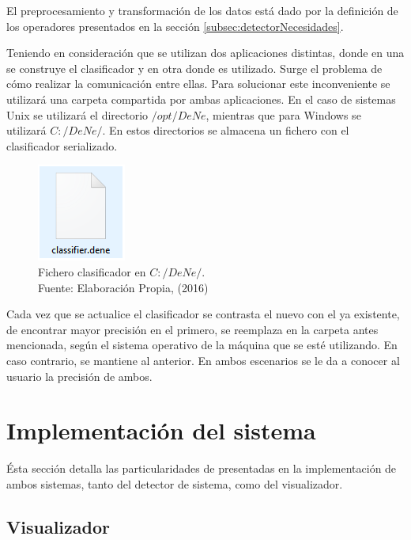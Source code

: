 El preprocesamiento y transformación de los datos está dado por la definición de los operadores presentados en la sección \ref{subsec:detectorNecesidades}.

Teniendo en consideración que se utilizan dos aplicaciones distintas, donde en una se construye el clasificador y en otra donde es utilizado. Surge el problema de cómo realizar la comunicación entre ellas. Para solucionar este inconveniente se utilizará una carpeta compartida por ambas aplicaciones. En el caso de sistemas Unix se utilizará el directorio $/opt/DeNe$, mientras que para Windows se utilizará $C:/DeNe/$. En estos directorios se almacena un fichero con el clasificador serializado.

\begin{figure}[H]
	\centering
	\captionsetup{justification=centering}
	\includegraphics[scale=0.8]{images/ClasifierDene.png}
	\caption[Fichero clasificador en $c:/DeNe/$.]{Fichero clasificador en $C:/DeNe/$.\\Fuente: Elaboración Propia, (2016)}
	\label{fig:TopologiaGeneral}
\end{figure}

Cada vez que se actualice el clasificador se contrasta el nuevo con el ya existente, de encontrar mayor precisión en el primero, se reemplaza en la carpeta antes mencionada, según el sistema operativo de la máquina que se esté utilizando. En caso contrario, se mantiene al anterior. En ambos escenarios se le da a conocer al usuario la precisión de ambos.

\section{Implementación del sistema}
\label{sec:implementacion}

Ésta sección detalla las particularidades de presentadas en la implementación de ambos sistemas, tanto del detector de sistema, como del visualizador.

\subsection{Visualizador}
\label{subsec:imp:visualizador}

